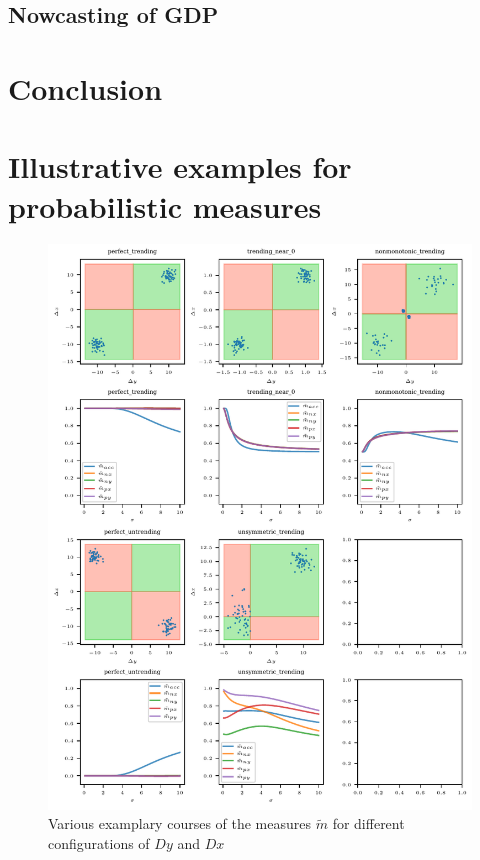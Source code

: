 \documentclass[oneside]{article}
\theoremstyle{plain}%
\theoremstyle{definition}
\newcommand{\ydiff}{D y}
\newcommand{\xdiff}{Dx}
\begin{document}
\subsection{Nowcasting of GDP}

\section{Conclusion}
\medskip
\printbibliography

\appendix
\section{Illustrative examples for probabilistic measures}

\begin{figure}
    \centering
    \includegraphics{plots/illustrative_examples/plots_4q_and_mtilde.pdf}
    \caption{Various examplary courses of the measures $\tilde{m}$ for different configurations of $\ydiff$ and $\xdiff$}
    \label{fig:example_mtilde}
\end{figure}
\end{document}
